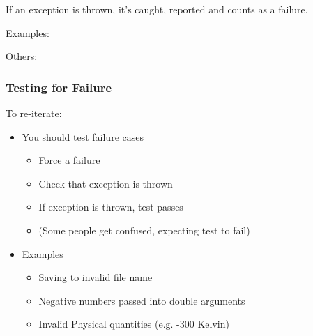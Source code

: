 If an exception is thrown, it's caught, reported and counts as a
failure.

Examples:

\begin{Shaded}
\begin{Highlighting}[]
     \NormalTok{);}
     \NormalTok{);}
\end{Highlighting}
\end{Shaded}

Others:

\begin{Shaded}
\begin{Highlighting}[]
     
       
\end{Highlighting}
\end{Shaded}

\subsubsection{Testing for Failure}\label{testing-for-failure}

To re-iterate:

\begin{itemize}
\itemsep1pt\parskip0pt
\item
  You should test failure cases

  \begin{itemize}
  \itemsep1pt\parskip0pt
  \item
    Force a failure
  \item
    Check that exception is thrown
  \item
    If exception is thrown, test passes
  \item
    (Some people get confused, expecting test to fail)
  \end{itemize}
\item
  Examples

  \begin{itemize}
  \itemsep1pt\parskip0pt
  \item
    Saving to invalid file name
  \item
    Negative numbers passed into double arguments
  \item
    Invalid Physical quantities (e.g. -300 Kelvin)
  \end{itemize}
\end{itemize}


